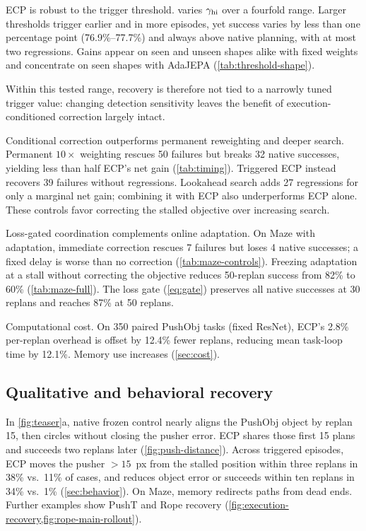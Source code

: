 

\par\smallskip\noindent ECP is robust to the trigger threshold.
 varies $\gamma_{\rm hi}$ over a fourfold range. Larger thresholds trigger earlier and in more episodes, yet success varies by less than one percentage point (76.9\%--77.7\%) and always above native planning, with at most two regressions. Gains appear on seen and unseen shapes alike with fixed weights and concentrate on seen shapes with AdaJEPA (\cref{tab:threshold-shape}).

Within this tested range, recovery is therefore not tied to a narrowly tuned trigger value: changing detection sensitivity leaves the benefit of execution-conditioned correction largely intact.



\par\smallskip\noindent Conditional correction outperforms permanent reweighting and deeper search.
Permanent $10\times$ weighting rescues 50 failures but breaks 32 native successes, yielding less than half ECP's net gain (\cref{tab:timing}). Triggered ECP instead recovers 39 failures without regressions. Lookahead search adds 27 regressions for only a marginal net gain; combining it with ECP also underperforms ECP alone. These controls favor correcting the stalled objective over increasing search.

\par\smallskip\noindent Loss-gated coordination complements online adaptation.
On Maze with adaptation, immediate correction rescues 7 failures but loses 4 native successes; a fixed delay is worse than no correction (\cref{tab:maze-controls}). Freezing adaptation at a stall without correcting the objective reduces 50-replan success from 82\% to 60\% (\cref{tab:maze-full}). The loss gate (\cref{eq:gate}) preserves all native successes at 30 replans and reaches 87\% at 50 replans.

\par\smallskip\noindent Computational cost.
On 350 paired PushObj tasks (fixed ResNet), ECP's 2.8\% per-replan overhead is offset by 12.4\% fewer replans, reducing mean task-loop time by 12.1\%. Memory use increases (\cref{sec:cost}).

\subsection{Qualitative and behavioral recovery}
\label{sec:qualitative}
In \cref{fig:teaser}a, native frozen control nearly aligns the PushObj object by replan 15, then circles without closing the pusher error. ECP shares those first 15 plans and succeeds two replans later (\cref{fig:push-distance}). Across triggered episodes, ECP moves the pusher $>15$~px from the stalled position within three replans in 38\% vs.\ 11\% of cases, and reduces object error or succeeds within ten replans in 34\% vs.\ 1\% (\cref{sec:behavior}). On Maze, memory redirects paths from dead ends. Further examples show PushT and Rope recovery (\cref{fig:execution-recovery,fig:rope-main-rollout}).
